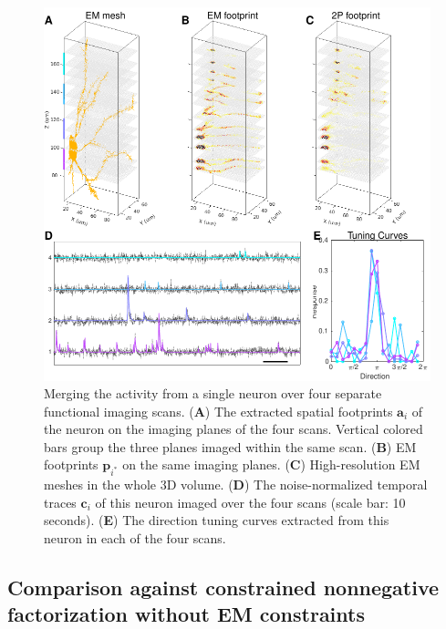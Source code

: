 \documentclass[10pt,letterpaper]{article}
\begin{document}
\begin{figure}[t!]
	\centering
	\includegraphics[width=1\textwidth]{Figs/fig_multi_scan.pdf}
	\caption{Merging the activity from a single neuron over four separate functional imaging scans.  (\textbf{A}) The extracted spatial footprints $\bm{a}_i$ of the neuron on the imaging planes of the four scans. Vertical colored bars group the three planes imaged within the same scan. (\textbf{B}) EM footprints $\bm{p}_{i^*}$ on the same imaging planes. (\textbf{C}) High-resolution EM meshes in the whole 3D volume. (\textbf{D}) The noise-normalized temporal traces $\bm{c}_i$ of this neuron imaged over the four scans (scale bar: 10 seconds).  (\textbf{E}) The direction tuning curves extracted from this neuron in each of the four scans.}
\label{fig:multi_scan}
\end{figure}

\subsection{Comparison against constrained nonnegative factorization without EM constraints}
\label{sec:compare}
\end{document}
